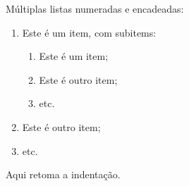 Múltiplas listas numeradas e encadeadas:
\begin{enumerate}
 \renewcommand{\theenumi}{\Roman{enumi}}
 \item Este é um item, com subitems:
  \begin{enumerate}
  \renewcommand{\theenumi}{\alpha{enumi}}
  \item Este é um item;
  \item Este é outro item;
  \item etc.
  \end{enumerate}
 \item Este é outro item;
 \item etc.
\end{enumerate}
Aqui retoma a indentação.

